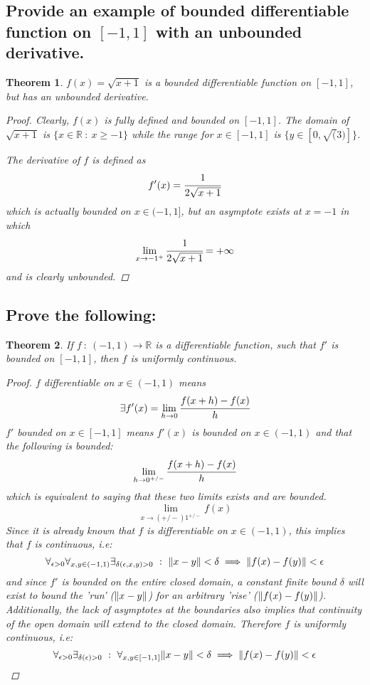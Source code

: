 \documentclass[]{article}
\newcommand{\R}{\mathbb{R}}
\newcommand{\st}{\ : \ }
\newtheorem{theorem}{Theorem}
\begin{document}
\subsection{
    Provide an example of bounded differentiable function on $[-1,1]$ with an unbounded derivative.
}
\begin{theorem}
    $f(x) = \sqrt{x + 1}$ is a bounded differentiable function on $[-1,1]$, but has an unbounded derivative.
    \begin{proof}
        Clearly, $f(x)$ is fully defined and bounded on $[-1,1]$.
        The domain of $\sqrt{x + 1}$ is $\{x \in \R \st x \geq -1\}$ while the range for $x \in [-1,1]$ is $\{y \in [0,\sqrt(3)]\}$.

        The derivative of $f$ is defined as 
        \[
            f'(x) = \cfrac{1}{2 \sqrt{x + 1}}
        \]
        which is actually bounded on $x \in (-1,1]$, but an asymptote exists at $x = -1$ in which 
        \[
            \lim_{x \to -1^+} \cfrac{1}{2 \sqrt{x + 1}} = + \infty
        \]
        and is clearly unbounded.
    \end{proof}
\end{theorem}

\subsection{Prove the following:}
\begin{theorem}
    If $f \st (-1,1) \to \R$ is a differentiable function, such that $f'$ is bounded on $[-1,1]$, then $f$ is uniformly continuous.
    \begin{proof}
        $f$ differentiable on $x \in (-1,1)$ means 
        \[
            \exists f'(x) = \lim_{h \to 0} \cfrac{f(x + h) - f(x)}{h}
        \]
        $f'$ bounded on $x \in [-1,1]$ means $f'(x)$ is bounded on $x \in (-1, 1)$ and that the following is bounded:
        \[
            \lim_{h \to 0^{+/-}} \cfrac{f(x + h) - f(x)}{h}
        \]
        which is equivalent to saying that these two limits exists and are bounded.
        \[
            \lim_{x \to (+/-)1^{+/-}} f(x)
        \]
        Since it is already known that $f$ is differentiable on $x \in (-1,1)$, this implies that $f$ is continuous, i.e:
        \[
            \forall_{\epsilon > 0} \forall_{x,y \in (-1,1)} \exists_{\delta(\epsilon,x,y) > 0} \st \norm{x - y} < \delta \implies \norm{f(x) - f(y)} < \epsilon
        \]
        and since $f'$ is bounded on the entire closed domain, a constant finite bound $\delta$ will exist to bound the 'run' ($\norm{x - y}$) for an arbitrary 'rise' ($\norm{f(x) - f(y)}$).
        Additionally, the lack of asymptotes at the boundaries also implies that continuity of the open domain will extend to the closed domain.
        Therefore $f$ is uniformly continuous, i.e:
        \[
            \forall_{\epsilon > 0} \exists_{\delta(\epsilon) > 0} \st \forall_{x,y \in [-1,1]} \norm{x - y} < \delta \implies \norm{f(x) - f(y)} < \epsilon
        \]
    \end{proof}
\end{theorem}
\end{document}
